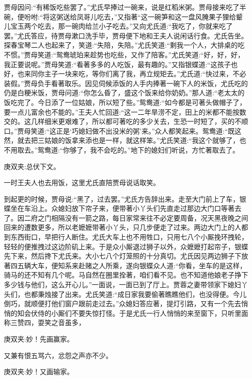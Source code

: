 \begin{parag}
    贾母因问:“有稀饭吃些罢了。”尤氏早捧过一碗来，说是红稻米粥。贾母接来吃了半碗，便吩咐:“将这粥送给凤哥儿吃去，”又指著“这一碗笋和这一盘风腌果子狸给颦儿宝玉两个吃去，那一碗肉给兰小子吃去。”又向尤氏道:“我吃了，你就来吃了罢。”尤氏答应，待贾母漱口洗手毕，贾母便下地和王夫人说闲话行食。尤氏告坐。探春宝琴二人也起来了，笑道:“失陪，失陪。”尤氏笑道:“剩我一个人，大排桌的吃不惯。”贾母笑道:“鸳鸯琥珀来趁势也吃些，又作了陪客。”尤氏笑道:“好，好，好，我正要说呢。”贾母笑道:“看著多多的人吃饭，最有趣的。”又指银蝶道:“这孩子也好，也来同你主子一块来吃，等你们离了我，再立规矩去。”尤氏道:“快过来，不必装假。”贾母负手看著取乐。因见伺候添饭的人手内捧著一碗下人的米饭，尤氏吃的仍是白粳米饭，贾母问道:“你怎么昏了，盛这个饭来给你奶奶。”那人道:“老太太的饭吃完了。今日添了一位姑娘，所以短了些。”鸳鸯道:“如今都是可著头做帽子了，要一点儿富余也不能的。”王夫人忙回道:“这一二年旱涝不定，田上的米都不能按数交的。这几样细米更艰难了，所以都可著吃的多少关去，生恐一时短了，买的不顺口。”贾母笑道:“这正是‘巧媳妇做不出没米的粥’来。”众人都笑起来。鸳鸯道:“既这然，就去把三姑娘的饭拿来添也是一样，就这样笨。”尤氏笑道:“我这个就够了，也不用取去。”鸳鸯道:“你够了，我不会吃的。”地下的媳妇们听说，方忙著取去了。\begin{note}庚双夹:总伏下文。\end{note}一时王夫人也去用饭，这里尤氏直陪贾母说话取笑。
\end{parag}


\begin{parag}
    到起更的时候，贾母说:“黑了，过去罢。”尤氏方告辞出来。走至大门前上了车，银蝶坐在车沿上。众媳妇放下帘子来，便带著小丫头们先直走过那边大门口等著去了。因二府之门相隔没有一箭之路，每日家常来往不必定要周备，况天黑夜晚之间回来的遭数更多，所以老嬷嬷带著小丫头，只几步便走了过来。两边大门上的人都到东西街口，早把行人断住。尤氏大车上也不用牲口，只用七八个小厮挽环拽轮，轻轻的便推拽过这边阶矶上来。于是众小厮退过狮子以外，众嬷嬷打起帘子，银蝶先下来，然后搀下尤氏来。大小七八个灯笼照的十分真切。尤氏因见两边狮子下放著四五辆大车，便知系来赴赌之人所乘，遂向银蝶众人道:“你看，坐车的是这样，骑马的还不知有几个呢。马自然在圈里拴著，咱们看不见。也不知道他娘老子挣下多少钱与他们，这么开心儿。”一面说，一面已到了厅上。贾蓉之妻带领家下媳妇丫头们，也都秉烛接了出来。尤氏笑道:“成日家我要偷著瞧瞧他们，也没得便。今儿倒巧，就顺便打他们窗户跟前走过去。”众媳妇答应著，提灯引路，又有一个先去悄悄的知会伏侍的小厮们不要失惊打怪。于是尤氏一行人悄悄的来至窗下，只听里面称三赞四，耍笑之音虽多，\begin{note}庚双夹:妙！先画赢家。\end{note}又兼有恨五骂六，忿怨之声亦不少。\begin{note}庚双夹:妙！又画输家。\end{note}
\end{parag}


